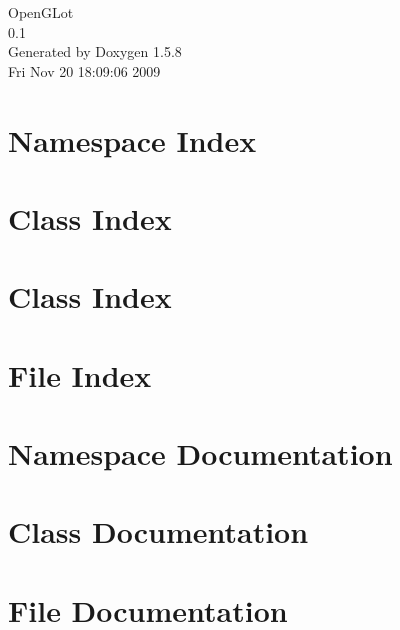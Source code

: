 \documentclass[a4paper]{book}
\begin{document}
\begin{titlepage}
\vspace*{7cm}
\begin{center}
{\Large OpenGLot \\[1ex]\large 0.1 }\\
\vspace*{1cm}
{\large Generated by Doxygen 1.5.8}\\
\vspace*{0.5cm}
{\small Fri Nov 20 18:09:06 2009}\\
\end{center}
\end{titlepage}
\clearemptydoublepage
{}
\tableofcontents
\clearemptydoublepage
{}
\chapter{Namespace Index}

\chapter{Class Index}

\chapter{Class Index}

\chapter{File Index}

\chapter{Namespace Documentation}

\chapter{Class Documentation}














\chapter{File Documentation}














\printindex
\end{document}
